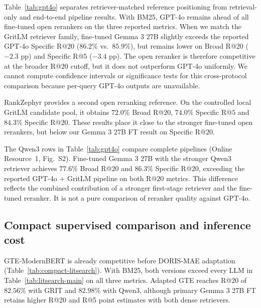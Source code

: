 \documentclass[pdflatex,sn-basic,Numbered]{sn-jnl}%
\theoremstyle{thmstyleone}%
\theoremstyle{thmstyletwo}%
\theoremstyle{thmstylethree}%
\begin{document}
Table~\ref{tab:gpt4o} separates retriever-matched reference positioning from
retrieval-only and end-to-end pipeline results. With BM25, GPT-4o remains ahead of all
fine-tuned open rerankers on the three reported metrics. When we match the
GritLM retriever family, fine-tuned Gemma 3 27B slightly exceeds the reported
GPT-4o Specific R@$20$ ($86.2\%$ vs.\ $85.9\%$), but remains lower on Broad
R@$20$ ($-2.3$ pp) and Specific R@$5$ ($-3.4$ pp). The open reranker is therefore
competitive at the broader R@$20$ cutoff, but it does not outperform GPT-4o
uniformly. We cannot compute confidence intervals or significance tests for this
cross-protocol comparison because per-query GPT-4o outputs are unavailable.

RankZephyr provides a second open reranking reference. On the controlled local
GritLM candidate pool, it obtains $72.0\%$ Broad R@$20$, $74.0\%$ Specific
R@$5$ and $84.3\%$ Specific R@$20$. These results place it close to the stronger
fine-tuned open rerankers, but below our Gemma 3 27B FT result on Specific
R@$20$.

The Qwen3 rows in Table~\ref{tab:gpt4o} compare complete pipelines
(Online Resource~1, Fig.~S2). Fine-tuned Gemma 3 27B with the stronger Qwen3 retriever
achieves $77.6\%$ Broad R@$20$ and $86.3\%$ Specific R@$20$, exceeding the
reported GPT-4o + GritLM pipeline on both R@$20$ metrics. This difference reflects
the combined contribution of a stronger first-stage retriever and the fine-tuned
reranker. It is not a pure comparison of reranker quality against GPT-4o.

\subsection{Compact supervised comparison and inference cost}
\label{sec:compact-results}
GTE-ModernBERT is already competitive before DORIS-MAE adaptation
(Table~\ref{tab:compact-litsearch}). With BM25, both versions exceed every LLM
in Table~\ref{tab:litsearch-main} on all three metrics. Adapted GTE reaches
R@20 of $82.56\%$ with GRIT and $82.98\%$ with Qwen3, although primary Gemma
3 27B FT retains higher R@20 and R@5 point estimates with both dense retrievers.
\end{document}
